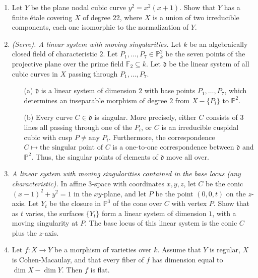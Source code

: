 \documentclass{article}
\newcommand{\goth}[1]{\mathfrak{#1}}
\newcommand{\PP}{\mathbb{P}}
\begin{document}
\begin{enumerate} [label=\textbf{\arabic*.}, leftmargin=0em]
\item Let $Y$ be the plane nodal cubic curve $y^2 = x^2(x + 1)$. Show that $Y$ has a finite étale covering $X$ of degree $2$2, where $X$ is a union of two irreducible components, each one isomorphic to the normalization of $Y$.

\item \textit{(Serre). A linear system with moving singularities.} Let $k$ be an algebraically closed field of characteristic $2$. Let $P_1, \dots, P_7 \in \PP_k^2$ be the seven points of the projective plane over the prime field $\mathbb{F}_2 \subseteq k$. Let $\goth{d}$ be the linear system of all cubic curves in $X$ passing through $P_1, \dots, P_7$.
\begin{itemize}
  \item[(a)] $\goth{d}$ is a linear system of dimension $2$ with base points $P_1, \dots, P_7$, which determines an inseparable morphism of degree $2$ from $X - \{P_i\}$ to $\PP^2$.
  \item[(b)] Every curve $C \in \goth{d}$ is singular. More precisely, either $C$ consists of $3$ lines all passing through one of the $P_i$, or $C$ is an irreducible cuspidal cubic with cusp $P \neq \text{any $P_i$}$. Furthermore, the correspondence $C \mapsto \text{the singular point of $C$}$ is a one-to-one correspondence between $\goth{d}$ and $\PP^2$. Thus, the singular points of elements of $\goth{d}$ move all over.
\end{itemize}

\item \textit{A linear system with moving singularities contained in the base locus (any characteristic).} In affine $3$-space with coordinates $x, y, z$, let $C$ be the conic $(x - 1)^2 + y^2 = 1$ in the $xy$-plane, and let $P$ be the point $(0, 0, t)$ on the $z$-axis. Let $Y_t$ be the closure in $\PP^3$ of the cone over $C$ with vertex $P$. Show that as $t$ varies, the surfaces $\{Y_t \}$ form a linear system of dimension $1$, with a moving singularity at $P$. The base locus of this linear system is the conic $C$ plus the $z$-axis.

\item Let $f : X \to Y$ be a morphism of varieties over $k$. Assume that $Y$ is regular, $X$ is Cohen-Macaulay, and that every fiber of $f$ has dimension equal to $\dim{X} - \dim{Y}$. Then $f$ is flat.

\end{enumerate}
\end{document}
